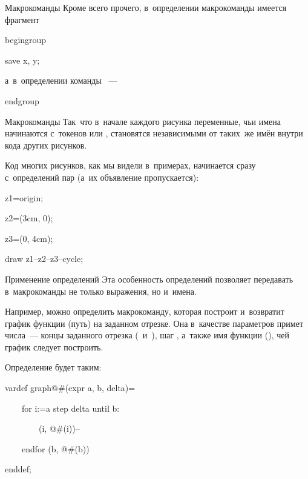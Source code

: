 
\begin{frame}{Макрокоманды }
Кроме всего прочего, в~определении макрокоманды  имеется
фрагмент
\begin{programlisting}
begingroup\par
save x, y;\par
\end{programlisting}
а~в~определении команды ~—
\begin{programlisting}
endgroup
\end{programlisting}
\end{frame}


\begin{frame}{Макрокоманды }
Так~что в~начале каждого рисунка переменные, чьи имена начинаются с~токенов
 или , становятся независимыми от таких~же имён внутри
кода других рисунков.

Код многих рисунков, как мы видели в~примерах, начинается сразу с~определений
пар  (а~их объявление пропускается):
\begin{programlisting}
z1=origin;\par
z2=(3cm, 0);\par
z3=(0, 4cm);\par
\leavevmode\par
draw z1--z2--z3--cycle;\par
\end{programlisting}
\end{frame}


\begin{frame}{Применение определений }
Эта особенность определений  позволяет передавать
в~макрокоманды не только выражения, но и~имена.

Например, можно определить макрокоманду, которая построит и~возвратит график
функции (путь) на заданном отрезке. Она в~качестве параметров примет числа~—
концы заданного отрезка ( и~), шаг ,
а~также имя функции (), чей график следует построить.

Определение будет таким:
\begin{programlisting}
vardef graph@\#(expr a, b, delta)=\par
~~~~for i:=a step delta until b:\par
~~~~~~~~(i, @\#(i))--\par
~~~~endfor (b, @\#(b))\par
enddef;
\end{programlisting}
\end{frame}


